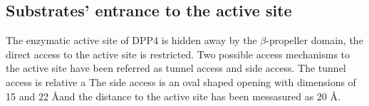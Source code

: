 \subsection{Substrates' entrance to the active site}

The enzymatic active site of DPP4 is hidden away by the $\beta$-propeller domain, the direct access to the active site is restricted. Two possible access mechanisms to the active site have been referred as tunnel access and side access. The tunnel access is relative a The side access is an oval shaped opening with dimensions of 15 and 22 \AA and the distance to the active site has been messasured as 20 \AA.~\cite{Engel_2003}